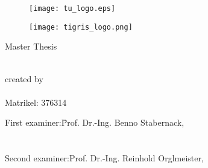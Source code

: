 \begin{titlepage}
\begin{centering}
	\begin{figure}[!h]
		\begin{center}
			\texttt{[image: tu\_logo.eps]}
		\end{center}
	\end{figure}
	\begin{figure}[!h]
			\begin{center}
				\texttt{[image: tigris\_logo.png]}
			\end{center}
	\end{figure}


	\vspace{10mm}

	\LARGE

	Master Thesis

	\textbf{\Title}\\[2cm]


	\large
	created by\\
	\Author\\
	Matrikel: 376314\\[3cm]

	\hspace*{-1.5cm}
	\begin{minipage}{\linewidth}
		\begin{tabbing}
    	First examiner:\qquad \= Prof. Dr.-Ing. Benno Stabernack,\\
			\\
			\\
    	Second examiner:\>Prof. Dr.-Ing. Reinhold Orglmeister,\\
  	\end{tabbing}
  \end{minipage}

	\vspace{20mm}

	\normalsize

	\Date\\
\end{centering}
\end{titlepage}
